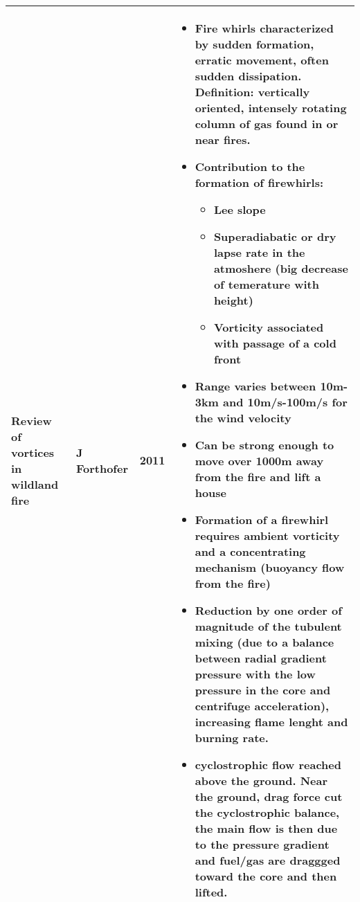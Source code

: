 \documentclass[12pt]{article}
\begin{document}
\begin{center}
\begin{longtable}{|p{4.5cm}|p{2cm}|p{0.8cm}|p{7.5cm}|}
\raggedright Review of vortices in wildland fire & J Forthofer & 2011 & \raggedleft 
\begin{itemize} 
\item Fire whirls characterized by sudden formation, erratic movement, often sudden dissipation. Definition: vertically oriented, intensely rotating column of gas found in or near fires.
\item Contribution to the formation of firewhirls:
	\begin{itemize}
	\item Lee slope
	\item Superadiabatic or dry lapse rate in the atmoshere (big decrease of temerature with height)
	\item Vorticity associated with passage of a cold front
	\end{itemize}
\item Range varies between 10m-3km and 10m/s-100m/s for the wind velocity
\item Can be strong enough to move over 1000m away from the fire and lift a house
\item Formation of a firewhirl requires ambient vorticity and a concentrating mechanism (buoyancy flow from the fire)
\item Reduction by one order of magnitude of the tubulent mixing (due to a balance between radial gradient pressure with the low pressure in the core and centrifuge acceleration), increasing flame lenght and burning rate.
\item cyclostrophic flow reached above the ground. Near the ground, drag force cut the cyclostrophic balance, the main flow is then due to the pressure gradient and fuel/gas are draggged toward the core and then lifted.
\end{itemize} 
\tabularnewline

\hline

\end{longtable}
\end{center}
 
\newpage 
 
\end{document}
